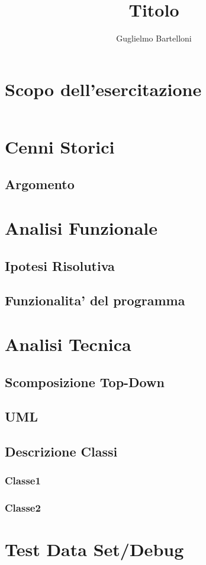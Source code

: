 \documentclass{article}
\author{Guglielmo Bartelloni}
\title{Titolo}
\begin{document}
\maketitle
\tableofcontents
\clearpage
%
%
\section{Scopo dell'esercitazione}
%
%
\begin{lstlisting}
\end{lstlisting}

\section{Cenni Storici}

\subsection{Argomento}


\section{Analisi Funzionale}

\subsection{Ipotesi Risolutiva}

\subsection{Funzionalita' del programma}


\section{Analisi Tecnica}

\subsection{Scomposizione Top-Down}

\subsection{UML}

\subsection{Descrizione Classi}
\subsubsection{Classe1}
\subsubsection{Classe2}


\section{Test Data Set/Debug}
\end{document}
